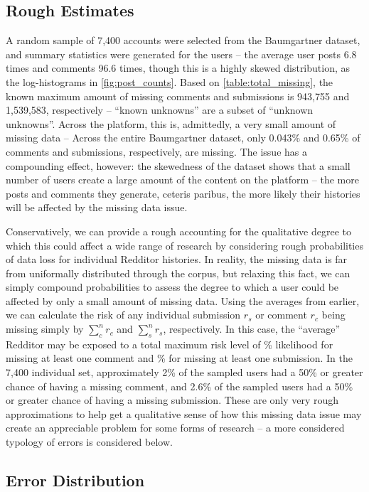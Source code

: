 \documentclass[letterpaper,12pt]{article}
\begin{document}
\subsection{Rough Estimates}

A random sample of 7,400 accounts were selected from the Baumgartner dataset, and summary statistics were generated for the users -- the average user posts 6.8 times and comments 96.6 times, though this is a highly skewed distribution, as the log-histograms in \ref{fig:post_counts}. Based on \ref{table:total_missing}, the known maximum amount of missing comments and submissions is 943,755 and 1,539,583, respectively -- ``known unknowns'' are a subset of ``unknown unknowns''. Across the platform, this is, admittedly, a very small amount of missing data -- Across the entire Baumgartner dataset, only 0.043\% and 0.65\% of comments and submissions, respectively, are missing. The issue has a compounding effect, however: the skewedness of the dataset shows that a small number of users create a large amount of the content on the platform -- the more posts and comments they generate, ceteris paribus, the more likely their histories will be affected by the missing data issue.

Conservatively, we can provide a rough accounting for the qualitative degree to which this could affect a wide range of research by considering rough probabilities of data loss for individual Redditor histories. In reality, the missing data is far from uniformally distributed through the corpus, but relaxing this fact, we can simply compound probabilities to assess the degree to which a user could be affected by only a small amount of missing data. Using the averages from earlier, we can calculate the risk of any individual submission $r_s$ or comment $r_c$ being missing  simply by $\sum_c^n r_c$ and $\sum_s^n r_s$, respectively. In this case, the ``average'' Redditor may be exposed to a total maximum risk level of \% likelihood for missing at least one comment and \% for missing at least one submission. In the 7,400 individual set, approximately 2\% of the sampled users had a 50\% or greater chance of having a missing comment, and 2.6\% of the sampled users had a 50\% or greater chance of having a missing submission. These are only very rough approximations to help get a qualitative sense of how this missing data issue may create an appreciable problem for some forms of research -- a more considered typology of errors is considered below.

\subsection{Error Distribution}
\end{document}
